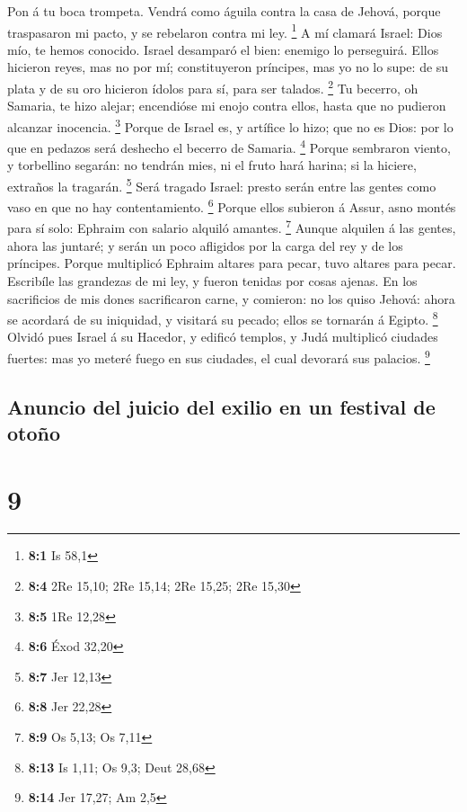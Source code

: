  Pon á tu boca trompeta. Vendrá como águila contra la casa
de Jehová, porque traspasaron mi pacto, y se rebelaron contra mi ley.
\footnote{\textbf{8:1} Is 58,1}  A mí clamará Israel: Dios
mío, te hemos conocido.  Israel desamparó el bien: enemigo
lo perseguirá.  Ellos hicieron reyes, mas no por mí;
constituyeron príncipes, mas yo no lo supe: de su plata y de su oro
hicieron ídolos para sí, para ser talados. \footnote{\textbf{8:4} 2Re
  15,10; 2Re 15,14; 2Re 15,25; 2Re 15,30}  Tu becerro, oh
Samaria, te hizo alejar; encendióse mi enojo contra ellos, hasta que no
pudieron alcanzar inocencia. \footnote{\textbf{8:5} 1Re 12,28}
 Porque de Israel es, y artífice lo hizo; que no es Dios:
por lo que en pedazos será deshecho el becerro de Samaria. \footnote{\textbf{8:6}
  Éxod 32,20}  Porque sembraron viento, y torbellino
segarán: no tendrán mies, ni el fruto hará harina; si la hiciere,
extraños la tragarán. \footnote{\textbf{8:7} Jer 12,13} 
Será tragado Israel: presto serán entre las gentes como vaso en que no
hay contentamiento. \footnote{\textbf{8:8} Jer 22,28} 
Porque ellos subieron á Assur, asno montés para sí solo: Ephraim con
salario alquiló amantes. \footnote{\textbf{8:9} Os 5,13; Os 7,11}
 Aunque alquilen á las gentes, ahora las juntaré; y serán
un poco afligidos por la carga del rey y de los príncipes.
 Porque multiplicó Ephraim altares para pecar, tuvo
altares para pecar.  Escribíle las grandezas de mi ley, y
fueron tenidas por cosas ajenas.  En los sacrificios de
mis dones sacrificaron carne, y comieron: no los quiso Jehová: ahora se
acordará de su iniquidad, y visitará su pecado; ellos se tornarán á
Egipto. \footnote{\textbf{8:13} Is 1,11; Os 9,3; Deut 28,68}
 Olvidó pues Israel á su Hacedor, y edificó templos, y
Judá multiplicó ciudades fuertes: mas yo meteré fuego en sus ciudades,
el cual devorará sus palacios. \footnote{\textbf{8:14} Jer 17,27; Am 2,5}

\hypertarget{anuncio-del-juicio-del-exilio-en-un-festival-de-otouxf1o}{%
\subsection{Anuncio del juicio del exilio en un festival de
otoño}\label{anuncio-del-juicio-del-exilio-en-un-festival-de-otouxf1o}}

\hypertarget{section-8}{%
\section{9}\label{section-8}}

